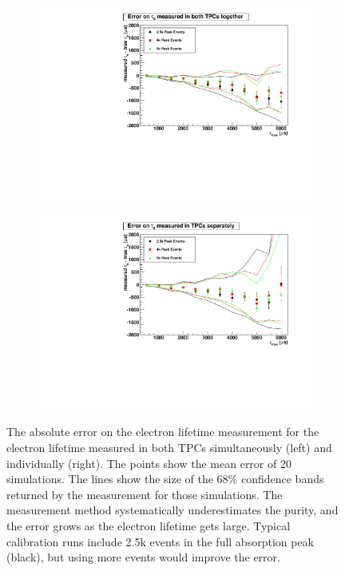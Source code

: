 \documentclass[herrin-thesis.tex]{subfiles}
\begin{document}
\begin{figure}[htbp]
\begin{subfigure}[b]{0.5\linewidth}
\centering
\includegraphics[width=1.0\columnwidth]{./plots/el_sim_error_both.pdf}
\end{subfigure}%
\begin{subfigure}[b]{0.5\linewidth}
\centering
\includegraphics[width=1.0\columnwidth]{./plots/el_sim_error_indiv.pdf}
\end{subfigure}
\caption[Error on reconstructed electron lifetime from simulation]{The absolute error on the electron lifetime measurement for the electron lifetime measured in both TPCs simultaneously (left) and individually (right). The points show the mean error of 20 simulations. The lines show the size of the 68\% confidence bands returned by the measurement for those simulations. The measurement method systematically underestimates the purity, and the error grows as the electron lifetime gets large. Typical calibration runs include 2.5k events in the full absorption peak (black), but using more events would improve the error.}
\label{fig:el_sim_err}
\end{figure}
\end{document}
